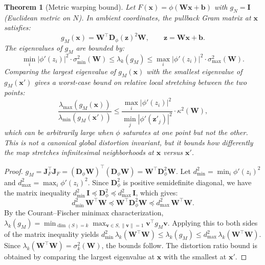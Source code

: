 \documentclass[11pt,a4paper]{article}
\newtheorem{theorem}{Theorem}
\theoremstyle{remark}
\begin{document}
\begin{theorem}[Metric warping bound]
\label{thm:metric-warp}
Let $F(\mathbf{x}) = \phi(\mathbf{W}\mathbf{x} + \mathbf{b})$ with $g_N = \mathbf{I}$ (Euclidean metric on $N$).
In ambient coordinates, the pullback Gram matrix at $\mathbf{x}$ satisfies:
\begin{equation}
  g_M(\mathbf{x}) = \mathbf{W}^\top \mathbf{D}_\phi(\mathbf{z})^2 \mathbf{W}, \qquad \mathbf{z} = \mathbf{W}\mathbf{x} + \mathbf{b}.
  \label{eq:pullback-explicit}
\end{equation}
The eigenvalues of $g_M$ are bounded by:
\begin{equation}
  \min_i |\phi'(z_i)|^2 \cdot \sigma_{\min}^2(\mathbf{W}) \leq \lambda_k(g_M) \leq \max_i |\phi'(z_i)|^2 \cdot \sigma_{\max}^2(\mathbf{W}).
  \label{eq:eigenvalue-bounds}
\end{equation}
Comparing the largest eigenvalue of $g_M(\mathbf{x})$ with the smallest eigenvalue of $g_M(\mathbf{x}')$ gives a worst-case bound on relative local stretching between the two points:
\begin{equation}
  \frac{\lambda_{\max}(g_M(\mathbf{x}))}{\lambda_{\min}(g_M(\mathbf{x}'))} \leq \frac{\max_i |\phi'(z_i)|^2}{\min_j |\phi'(\mathbf{z}'_j)|^2} \cdot \kappa^2(\mathbf{W}),
  \label{eq:distortion-ratio}
\end{equation}
which can be arbitrarily large when $\phi$ saturates at one point but not the other.
This is not a canonical global distortion invariant, but it bounds how differently the map stretches infinitesimal neighborhoods at $\mathbf{x}$ versus $\mathbf{x}'$.
\end{theorem}

\begin{proof}
$g_M = \mathbf{J}_F^\top \mathbf{J}_F = (\mathbf{D}_\phi \mathbf{W})^\top (\mathbf{D}_\phi \mathbf{W}) = \mathbf{W}^\top \mathbf{D}_\phi^2 \mathbf{W}$.
Let $d_{\min}^2 = \min_i \phi'(z_i)^2$ and $d_{\max}^2 = \max_i \phi'(z_i)^2$.
Since $\mathbf{D}_\phi^2$ is positive semidefinite diagonal, we have the matrix inequality $d_{\min}^2 \, \mathbf{I} \preceq \mathbf{D}_\phi^2 \preceq d_{\max}^2 \, \mathbf{I}$, which gives:
\[
  d_{\min}^2 \, \mathbf{W}^\top \mathbf{W} \preceq \mathbf{W}^\top \mathbf{D}_\phi^2 \mathbf{W} \preceq d_{\max}^2 \, \mathbf{W}^\top \mathbf{W}.
\]
By the Courant--Fischer minimax characterization, $\lambda_k(g_M) = \min_{\dim(S)=k} \max_{\mathbf{v} \in S, \|\mathbf{v}\|=1} \mathbf{v}^\top g_M \mathbf{v}$.
Applying this to both sides of the matrix inequality yields
$d_{\min}^2 \, \lambda_k(\mathbf{W}^\top \mathbf{W}) \leq \lambda_k(g_M) \leq d_{\max}^2 \, \lambda_k(\mathbf{W}^\top \mathbf{W})$.
Since $\lambda_k(\mathbf{W}^\top \mathbf{W}) = \sigma_k^2(\mathbf{W})$, the bounds follow.
The distortion ratio bound is obtained by comparing the largest eigenvalue at $\mathbf{x}$ with the smallest at $\mathbf{x}'$.
\end{proof}
\end{document}
